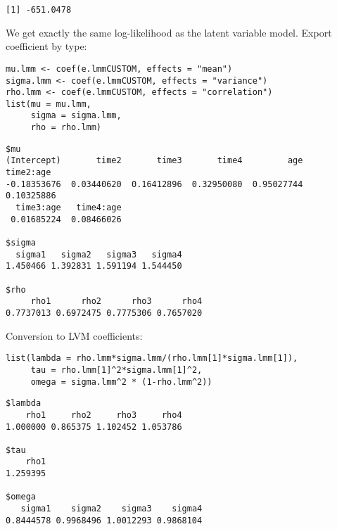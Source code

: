 \documentclass[12pt]{article}
\begin{document}
\begin{verbatim}
[1] -651.0478
\end{verbatim}


We get exactly the same log-likelihood as the latent variable
model. Export coefficient by type:

\lstset{language=r,label= ,caption= ,captionpos=b,numbers=none}
\begin{lstlisting}
mu.lmm <- coef(e.lmmCUSTOM, effects = "mean")
sigma.lmm <- coef(e.lmmCUSTOM, effects = "variance")
rho.lmm <- coef(e.lmmCUSTOM, effects = "correlation")
list(mu = mu.lmm,
     sigma = sigma.lmm,
     rho = rho.lmm)
\end{lstlisting}

\begin{verbatim}
$mu
(Intercept)       time2       time3       time4         age   time2:age 
-0.18353676  0.03440620  0.16412896  0.32950080  0.95027744  0.10325886 
  time3:age   time4:age 
 0.01685224  0.08466026 

$sigma
  sigma1   sigma2   sigma3   sigma4 
1.450466 1.392831 1.591194 1.544450 

$rho
     rho1      rho2      rho3      rho4 
0.7737013 0.6972475 0.7775306 0.7657020
\end{verbatim}

\clearpage

Conversion to LVM coefficients:
\lstset{language=r,label= ,caption= ,captionpos=b,numbers=none}
\begin{lstlisting}
list(lambda = rho.lmm*sigma.lmm/(rho.lmm[1]*sigma.lmm[1]),
     tau = rho.lmm[1]^2*sigma.lmm[1]^2,
     omega = sigma.lmm^2 * (1-rho.lmm^2))
\end{lstlisting}

\begin{verbatim}
$lambda
    rho1     rho2     rho3     rho4 
1.000000 0.865375 1.102452 1.053786 

$tau
    rho1 
1.259395 

$omega
   sigma1    sigma2    sigma3    sigma4 
0.8444578 0.9968496 1.0012293 0.9868104
\end{verbatim}
\end{document}
